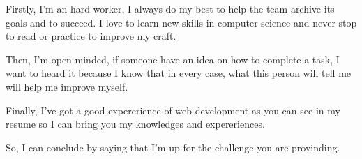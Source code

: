 Firstly, I'm an hard worker, I always do my best to help the team archive its goals and to succeed. I love to learn new skills in computer science and never stop to read or practice to improve my craft.

Then, I'm open minded, if someone have an idea on how to complete a task, I want to heard it because I know that in every case, what this person will tell me will help me improve myself.

Finally, I've got a good expererience of web development as you can see in my resume so I can bring you my knowledges and expereriences.

So, I can conclude by saying that I'm up for the challenge you are provinding.